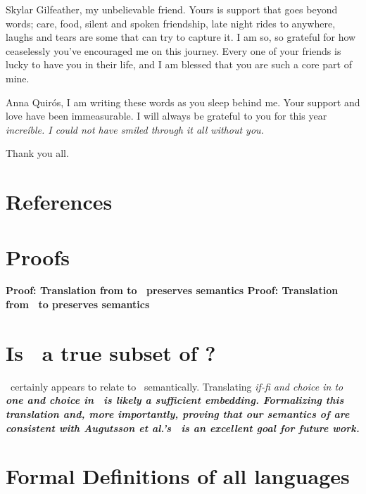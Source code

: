 \documentclass[manuscript,screen,review, 12pt, nonacm]{acmart}
\begin{document}
Skylar Gilfeather, my unbelievable friend. Yours is support that goes
beyond words; care, food, silent and spoken friendship, late night rides to
anywhere, laughs and tears are some that can try to capture it. I am so, so
grateful for how ceaselessly you've encouraged me on this journey. Every one
of your friends is lucky to have you in their life, and I am blessed that 
you are such a core part of mine. 

Anna Quirós, I am writing these words as you sleep behind me. Your support
and love have been immeasurable. I will always be grateful to you for this
year \it{increíble}. I could not have smiled through it all without you. 

Thank you all. 

\section{References}



\renewcommand\thesection{\Alph{section}}
\setcounter{section}{0}
\section{Proofs}
\begin{outline}
\1 \bf{Proof: Translation from \VMinus to \D\ preserves semantics }
\1 \bf{Proof: Translation from \PPlus\ to \VMinus preserves semantics }
\end{outline}

\section{Is \VMinus\ a true subset of \VC?}
\VMinus\ certainly appears to relate to \VC\ semantically. Translating
\it{if-fi} and choice in \VMinus to \bf{one} and choice in \VC\ is likely a
sufficient embedding. Formalizing this translation and, more importantly,
proving that our semantics of \VMinus are consistent with Augutsson et al.'s
\VC\ is an excellent goal for future work. 

\section{Formal Definitions of all languages}
\label{languagedefs}

\utable
\ppsemantics
\vmsemantics
\end{document}
